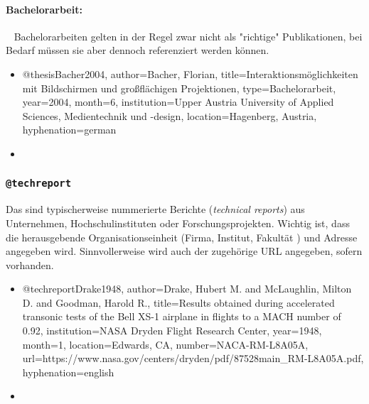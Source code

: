
\paragraph{Bachelorarbeit:} ~ \newline
Bachelorarbeiten gelten in der Regel zwar nicht als "richtige" Publikationen, bei Bedarf müssen sie aber dennoch referenziert werden können. 
%
\begin{itemize}
\item[]
\begin{GenericCode}[numbers=none]
@thesis{Bacher2004,
  author={Bacher, Florian},
  title={Interaktionsmöglichkeiten mit Bildschirmen und großflächigen Projektionen},
  type={Bachelorarbeit},
  year={2004},
  month={6},
  institution={Upper Austria University of Applied Sciences, Medientechnik und {-design}},
  location={Hagenberg, Austria},
  hyphenation={german}
}
\end{GenericCode}
\item[\cite{Bacher2004}] 
\end{itemize}


\subsubsection{\texttt{@techreport}}
\label{sec:@techreport}
Das sind typischerweise nummerierte Berichte (\emph{technical reports}) aus Unternehmen, 
Hochschulinstituten oder Forschungsprojekten.
Wichtig ist, dass die herausgebende Organisationseinheit (Firma, Institut, Fakultät \etc) und 
Adresse angegeben wird. Sinnvollerweise wird auch der zugehörige URL angegeben, sofern vorhanden. 
%
\begin{itemize}
\item[]
\begin{GenericCode}[numbers=none]
@techreport{Drake1948,
  author={Drake, Hubert M. and McLaughlin, Milton D. and Goodman, Harold R.},
  title={Results obtained during accelerated transonic tests of the {Bell} {XS-1} airplane in flights to a {MACH} number of 0.92},
  institution={NASA Dryden Flight Research Center},
  year={1948},
  month={1},
  location={Edwards, CA},
  number={NACA-RM-L8A05A},
  url={https://www.nasa.gov/centers/dryden/pdf/87528main_RM-L8A05A.pdf},
  hyphenation={english}
}
\end{GenericCode}
\item[\cite{Drake1948}] 
\end{itemize}

